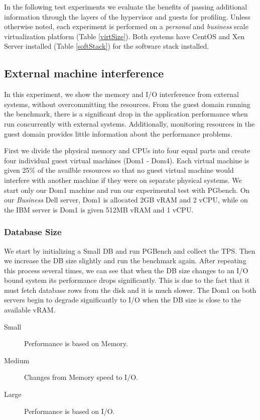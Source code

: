 In the following test experiments we evaluate the benefits of passing additional information through the layers of the hypervisor and guests for profiling.  Unless otherwise noted, each experiment is performed on a \emph{personal} and \emph{business} scale virtualization platform (Table \ref{virtSize}).  Both systems have CentOS and Xen Server installed (Table \ref{softStack}) for the software stack installed.

\subsection{External machine interference}
In this experiment, we show the memory and I/O interference from external systems, without overcommitting the resources.  From the guest domain running the benchmark, there is a significant drop in the application performance when run concurrently with external systems.  Additionally, monitoring resources in the guest domain provides little information about the performance problems. 

First we divide the physical memory and CPUs into four equal parts and create four individual guest virtual machines (Dom1 - Dom4).  Each virtual machine is given 25\% of the availble resources so that no guest virtual machine would interfere with another machine if they were on separate physical systems.  We start only our Dom1 machine and run our experimental test with PGbench.  On our \emph{Business} Dell server, Dom1 is allocated 2GB vRAM and 2 vCPU, while on the IBM server is Dom1 is given 512MB vRAM and 1 vCPU.  

\subsubsection{Database Size}
We start by initializing a Small DB and run PGBench and collect the TPS.  Then we increase the DB size slightly and run the benchmark again.  After repeating this process several times, we can see that when the DB size changes to an I/O bound system its performance drops significantly.  This is due to the fact that it must fetch database rows from the disk and it is much slower.  The Dom1 on both servers begin to degrade significantly to I/O when the DB size is close to the available vRAM.

\begin{description}
  \item[Small] Performance is based on Memory.
  \item[Medium] Changes from Memory speed to I/O.
  \item[Large] Performance is based on I/O.
\end{description}

